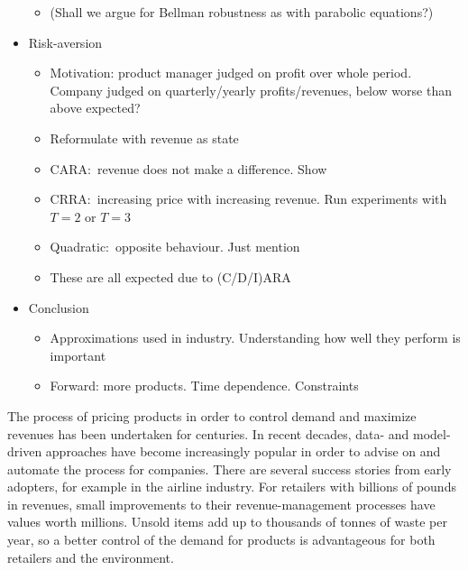 \documentclass[main.tex]{subfiles}
\begin{document}
\begin{itemize}
\begin{itemize}
  \item (Shall we argue for Bellman robustness as with parabolic equations?)
  \end{itemize}
\item Risk-aversion
  \begin{itemize}
  \item Motivation: product manager judged on profit over whole
    period. Company judged on quarterly/yearly profits/revenues, below worse
    than above expected?
  \item Reformulate with revenue as state
  \item CARA:~revenue does not make a difference. Show
  \item CRRA:~increasing price with increasing revenue. Run
    experiments with $T=2$ or $T=3$
  \item Quadratic:~opposite behaviour. Just mention
  \item These are all expected due to (C/D/I)ARA
  \end{itemize}
\item Conclusion
  \begin{itemize}
  \item Approximations used in industry. Understanding how well they
    perform is important
  \item Forward: more products. Time dependence. Constraints
  \end{itemize}
\end{itemize}

The process of pricing products in order to control demand and
maximize revenues has been undertaken for centuries. In recent
decades, data- and model-driven approaches have become increasingly
popular in order to advise on and automate the process for companies.
There are several success stories from early adopters, for example in
the airline industry.
For retailers with billions of pounds in revenues, small
improvements to their revenue-management processes have values worth millions.
Unsold items add up to thousands of tonnes of waste per year, so
a better control of the demand for products is advantageous
for both retailers and the environment.
\end{document}
